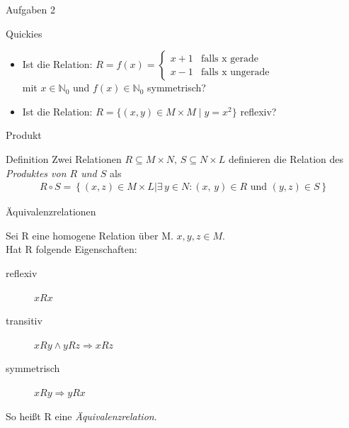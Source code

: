 \begin{frame}{Aufgaben 2}
    \begin{exampleblock}{Quickies}
        \begin{itemize}
            \item Ist die Relation: 
                $
                R = f(x) =
                \begin{cases}
                x + 1 & \text{falls x gerade}\\
                x - 1 & \text{falls x ungerade}
                \end{cases}
                $
                \\ mit $x\in \mathbb{N}_0$ und $f(x) \in \mathbb{N}_0$ symmetrisch?
            \item Ist die Relation: $R = \{(x,y)\in M \times M \;|\; y = x^2\} $ reflexiv?
        \end{itemize}
    \end{exampleblock}
\end{frame}

\begin{frame}{Produkt}
    \begin{block}{Definition}
        Zwei Relationen $R\subseteq M \times N ,\, S\subseteq N\times L$ definieren die Relation des \emph{Produktes von $R$ und $S$} als
        \begin{align*}
            R \circ S = \left\{\left( x,z\right)\in M\times L | \exists\, y \in N :\left( x,\, y\right) \in R \text{ und } \left( y, z\right) \in S\right\}
        \end{align*}
    \end{block}
    \pause
\end{frame}

\begin{frame}{Äquivalenzrelationen}
	\begin{definition}
    Sei R eine homogene Relation über M. $x, y, z \in M$.\\
    Hat R folgende Eigenschaften:
		\begin{description}
			\item[reflexiv] $x R x$
			\item[transitiv] $x R y \wedge y R z \Rightarrow x R z$
			\item[symmetrisch] $x R y \Rightarrow y R x$
		\end{description}
		So heißt R eine \emph{Äquivalenzrelation}.
	\end{definition}
\end{frame}

